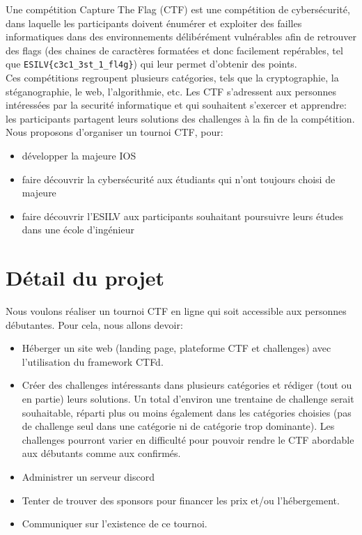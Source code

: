 \documentclass[12pt]{article}
\begin{document}
    Une compétition Capture The Flag (CTF) est une compétition de cybersécurité, dans laquelle les participants doivent énumérer et exploiter des failles informatiques dans des environnements délibérément vulnérables afin de retrouver des flags (des chaines de caractères formatées et donc facilement repérables, tel que \verb+ESILV{c3c1_3st_1_fl4g}+) qui leur permet d’obtenir des points.\\ Ces compétitions regroupent plusieurs catégories, tels que la cryptographie, la stéganographie, le web, l’algorithmie, etc. Les CTF s’adressent aux personnes intéressées par la securité informatique et qui souhaitent s’exercer et apprendre: les participants partagent leurs solutions des challenges à la fin de la compétition. Nous proposons d’organiser un tournoi CTF, pour:
    \begin{itemize}
        \item{développer la majeure IOS}
        \item{faire découvrir la cybersécurité aux étudiants qui n’ont toujours choisi de majeure}
        \item{faire découvrir l’ESILV aux participants souhaitant poursuivre leurs études dans une école d’ingénieur}
    \end{itemize}

    \section{Détail du projet}
    Nous voulons réaliser un tournoi CTF en ligne qui soit accessible aux personnes débutantes. Pour cela, nous allons devoir:
    \begin{itemize}
        \item{Héberger un site web (landing page, plateforme CTF et challenges) avec l’utilisation du framework CTFd.}
        \item{Créer des challenges intéressants dans plusieurs catégories et rédiger (tout ou en partie) leurs solutions. Un total d’environ une trentaine de challenge serait souhaitable, réparti plus ou moins également dans les catégories choisies (pas de challenge seul dans une catégorie ni de catégorie trop dominante). Les challenges pourront varier en difficulté pour pouvoir rendre le CTF abordable aux débutants comme aux confirmés.}
        \item{Administrer un serveur discord}
        \item{Tenter de trouver des sponsors pour financer les prix et/ou l’hébergement.}
        \item{Communiquer sur l’existence de ce tournoi.}
    \end{itemize}
\end{document}
